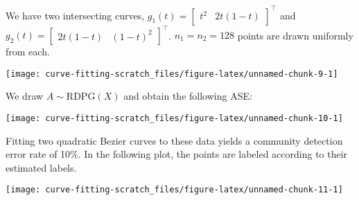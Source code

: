 \documentclass[
  11pt,
]{article}
\begin{document}
\begin{example}



We have two intersecting curves, $g_1(t) = \begin{bmatrix} t^2 & 2 t (1 - t) \end{bmatrix}^\top$ and $g_2(t) = \begin{bmatrix} 2 t (1 - t) & (1 - t) ^ 2 \end{bmatrix}^\top$. $n_1 = n_2 = 128$ points are drawn uniformly from each.


\begin{center}\texttt{[image: curve-fitting-scratch\_files/figure-latex/unnamed-chunk-9-1]} \end{center}

We draw $A \sim \mathrm{RDPG}(X)$ and obtain the following ASE:


\begin{center}\texttt{[image: curve-fitting-scratch\_files/figure-latex/unnamed-chunk-10-1]} \end{center}

Fitting two quadratic Bezier curves to these data yields a community detection error rate of 10\%. 
In the following plot, the points are labeled according to their estimated labels.


\begin{center}\texttt{[image: curve-fitting-scratch\_files/figure-latex/unnamed-chunk-11-1]} \end{center}

\end{example}

  
\end{document}
